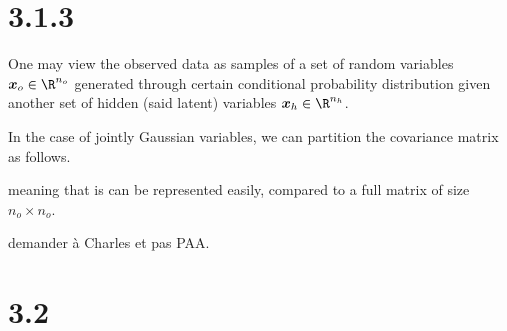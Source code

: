 \section*{3.1.3}
One may view the observed data as samples of a set of random variables $\boldsymbol{x}_o\in \R^{n_o}$ generated through certain conditional probability distribution given another set of hidden (said latent) variables $\boldsymbol{x}_h\in \R^{n_h}$. 

In the case of jointly Gaussian variables, we can partition the covariance matrix as follows. 

meaning that is can be represented easily, compared to a full matrix of size $n_o\times n_o$. 

demander à Charles et pas PAA.

\section*{3.2}
